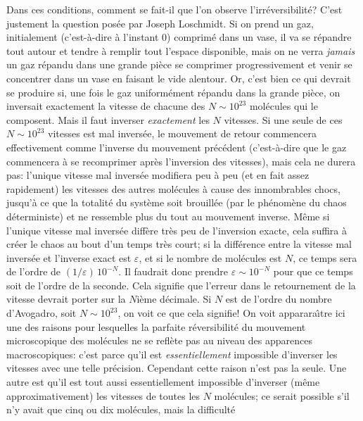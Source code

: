 \medskip
Dans ces conditions, comment se fait-il que l'on observe
l'irr\'eversibilit\'e?  C'est justement la question pos\'ee par 
Joseph Loschmidt. Si on prend un gaz, initialement (c'est-\`a-dire 
\`a l'instant $0$) comprim\'e dans un vase, il va se r\'epandre tout 
autour et tendre \`a remplir tout l'espace disponible, mais on ne verra 
{\it jamais} un gaz r\'epandu dans une grande pi\`ece se comprimer 
progressivement et venir se concentrer dans un vase en faisant le vide 
alentour. Or, c'est bien ce qui devrait se produire si, une fois le gaz 
uniform\'ement r\'epandu dans la grande pi\`ece, on inversait exactement 
la vitesse de chacune des $N \sim 10^{23}$ mol\'ecules qui le composent. 
Mais il faut inverser {\it exactement} les $N$ vitesses. Si une seule de
ces $N \sim 10^{23}$ vitesses est mal invers\'ee, le mouvement de retour 
commencera effectivement comme l'inverse du mouvement pr\'ec\'edent 
(c'est-\`a-dire que le gaz commencera \`a se recomprimer apr\`es 
l'inversion des vitesses), mais cela ne durera pas: l'unique vitesse 
mal invers\'ee modifiera peu \`a peu (et en fait assez rapidement)
les vitesses des autres mol\'ecules 
\`a cause des innombrables chocs, jusqu'\`a ce que la totalit\'e du 
syst\`eme soit brouill\'ee (par le ph\'enom\`ene du chaos d\'eterministe) 
et ne ressemble plus du tout au mouvement inverse. M\^eme si l'unique 
vitesse mal invers\'ee diff\`ere tr\`es peu de l'inversion exacte, 
cela suffira \`a cr\'eer le chaos au bout d'un temps tr\`es court; 
si la diff\'erence entre la vitesse mal invers\'ee et l'inverse exact 
est $\varepsilon$, et si le nombre de mol\'ecules est $N$, 
ce temps sera de l'ordre de $(1 / \varepsilon )\, 10^{-N}$. 
Il faudrait donc prendre $\varepsilon
\sim 10^{-N}$ pour que ce temps soit de l'ordre de la seconde. Cela 
signifie que l'erreur dans le retournement de la vitesse devrait porter 
sur la $N$i\`eme d\'ecimale. Si $N$ est de l'ordre du nombre d'Avogadro, 
soit $N \sim 10^{23}$, on voit ce que cela signifie!
\medskip
On voit apparara{\^\i}tre ici une des raisons pour lesquelles la parfaite 
r\'eversibilit\'e du mouvement microscopique des mol\'ecules ne se refl\`ete 
pas au niveau des apparences macroscopiques: c'est parce qu'il est 
{\it essentiellement} impossible d'inverser les vitesses avec une telle 
pr\'ecision. Cependant cette raison n'est pas la seule. Une autre est qu'il 
est tout aussi essentiellement impossible d'inverser (m\^eme 
approximativement) les vitesses de toutes les $N$ mol\'ecules; ce serait 
possible s'il n'y avait que cinq ou dix mol\'ecules, mais la difficult\'e 
